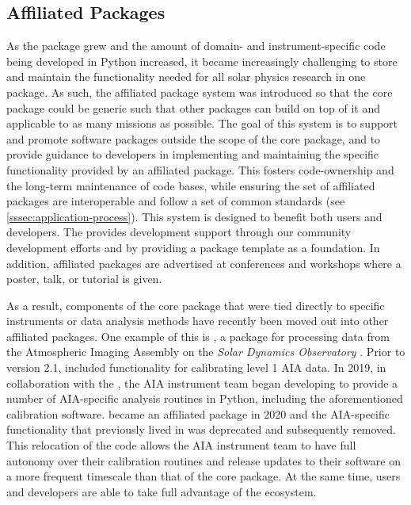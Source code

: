 \subsection{Affiliated Packages}
\label{ssec:affiliated-packages}

As the \sunpypkg package grew and the amount of domain- and instrument-specific code being developed in Python increased, it became increasingly challenging to store and maintain the functionality needed for all solar physics research in one package.
As such, the affiliated package system was introduced \citep{mumford_stuart_2014_3261752} so that the \sunpypkg core package could be generic such that other packages can build on top of it and applicable to as many missions as possible.
The goal of this system is to support and promote software packages outside the scope of the \sunpypkg core package, and to provide guidance to developers in implementing and maintaining the specific functionality provided by an affiliated package.
This fosters code-ownership and the long-term maintenance of code bases, while ensuring the set of affiliated packages are interoperable and follow a set of common standards (see \autoref{sssec:application-process}).
This system is designed to benefit both users and developers.
The \sunpyproj provides development support through our community development efforts and by providing a package template as a foundation.
In addition, affiliated packages are advertised at conferences and workshops where a \sunpy poster, talk, or tutorial is given.

As a result, components of the \sunpypkg core package that were tied directly to specific instruments or data analysis methods have recently been moved out into other affiliated packages.
One example of this is \aiapypkg, a package for processing data from the Atmospheric Imaging Assembly \citep[AIA,][]{lemen_atmospheric_2012} on the \textit{Solar Dynamics Observatory} \citep[SDO,][]{pesnell_solar_2012}.
Prior to version 2.1, \sunpypkg included functionality for calibrating level 1 AIA data.
In 2019, in collaboration with the \sunpyproj, the AIA instrument team began developing \aiapypkg to provide a number of AIA-specific analysis routines in Python, including the aforementioned calibration software.
\aiapypkg became an affiliated package in 2020 and the AIA-specific functionality that previously lived in \sunpypkg was deprecated and subsequently removed.
This relocation of the code allows the AIA instrument team to have full autonomy over their calibration routines and release updates to their software on a more frequent timescale than that of the \sunpypkg core package.
At the same time, \aiapypkg users and developers are able to take full advantage of the \sunpyproj ecosystem.

